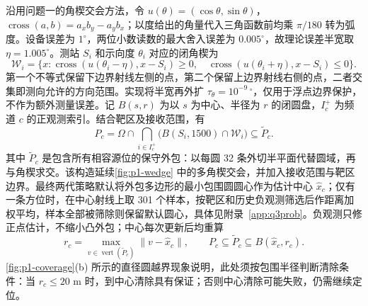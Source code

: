 沿用问题一的角楔交会方法，令 $u(\theta)=(\cos\theta,\sin\theta)$，$\operatorname{cross}(a,b)=a_xb_y-a_yb_x$；以度给出的角量代入三角函数前均乘 $\pi/180$ 转为弧度。设备误差为 $1^\circ$，两位小数读数的最大舍入误差为 $0.005^\circ$，故理论误差半宽取 $\eta=1.005^\circ$。测站 $S_i$ 和示向度 $\theta_i$ 对应的闭角楔为
\begin{equation}\label{eq:q3-wedge}
 \mathcal W_i=\{x:\operatorname{cross}(u(\theta_i-\eta),x-S_i)\ge0,\quad
          \operatorname{cross}(u(\theta_i+\eta),x-S_i)\le0\}.
\end{equation}
第一个不等式保留下边界射线左侧的点，第二个保留上边界射线右侧的点，二者交集即测向允许的方向范围。实现将半宽再外扩 $\tau_\theta=10^{-9}\,{}^\circ$，仅用于浮点边界保护，不作为额外测量误差。记 $B(s,r)$ 为以 $s$ 为中心、半径为 $r$ 的闭圆盘，$I_c^+$ 为频道 $c$ 的正观测索引。结合靶区及接收范围，有
\begin{equation}\label{eq:q3-region}
 P_c=\Omega\cap\bigcap_{i\in I_c^+}\bigl(B(S_i,1500)\cap\mathcal W_i\bigr)
       \subseteq\widetilde P_c .
\end{equation}
其中 $\widetilde P_c$ 是包含所有相容源位的保守外包：以每圆 32 条外切半平面代替圆域，再与角楔求交。该构造延续\cref{fig:p1-wedge} 中的多角楔交会，并加入接收范围与靶区边界。最终两代策略默认将外包多边形的最小包围圆圆心作为估计中心 $\hat x_c$；仅有一条方位时，在中心射线上取 301 个样本，按靶区和历史负观测筛选后作距离加权平均，样本全部被筛除则保留默认圆心，具体见附录~\ref{app:q3prob}。负观测只修正点估计，不缩小凸外包；中心每次更新后均重算
\[
 r_c=\max_{v\in\operatorname{vert}(\widetilde P_c)}\|v-\hat x_c\|,
 \qquad P_c\subseteq\widetilde P_c\subseteq B(\hat x_c,r_c).
\]
\cref{fig:p1-coverage}(b) 所示的直径圆越界现象说明，此处须按包围半径判断清除条件：当 $r_c\le20$ m 时，到中心清除具有保证；否则中心清除可能失败，仍需继续定位。

